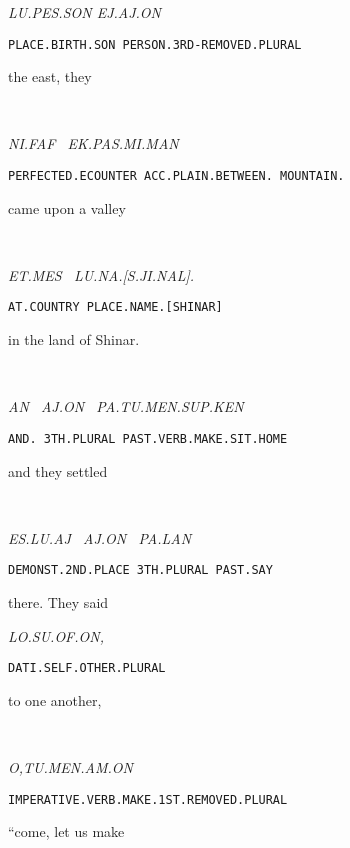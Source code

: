 {{\it LU.PES.SON 	EJ.AJ.ON }

{\tt PLACE.BIRTH.SON	PERSON.3RD-REMOVED.PLURAL }

the east, 		they 		 


\drie 


\Atlanni\faf~\ek\pas\mi\man

{\it NI.FAF~                                EK.PAS.MI.MAN }

{\tt PERFECTED.ECOUNTER  	ACC.PLAIN.BETWEEN. MOUNTAIN.	}

came upon 		a valley                 


\drie  


\et\mes~\lu\na\cartouche{\Atlans\ji\nal}\period

{\it ET.MES~		LU.NA.[S.JI.NAL]. }

{\tt AT.COUNTRY	PLACE.NAME.[SHINAR] }

in the land          of Shinar. 

\drie



\an~\aj\on~\pa\tu\men\Atlansup\ken

{\it AN~	AJ.ON~   PA.TU.MEN.SUP.KEN }

{\tt AND.	3TH.PLURAL	PAST.VERB.MAKE.SIT.HOME	 }

and 	they 		settled			 

\drie
  


\es\lu\aj~\period \aj\on~\pa\lan

{\it ES.LU.AJ~		AJ.ON~		PA.LAN	 }

{\tt DEMONST.2ND.PLACE	3TH.PLURAL	PAST.SAY }

there.			They		said 	 

\drie 


\lo\su\of\on\comma

{\it LO.SU.OF.ON, }

{\tt DATI.SELF.OTHER.PLURAL		 }
 
to one another, 			 
\drie 



  

\Atlano\comma\tu\men\am\on\

{\it O,TU.MEN.AM.ON }

{\tt IMPERATIVE.VERB.MAKE.1ST.REMOVED.PLURAL }

“come, let us make   


\drie 

 


\ek\fuk\jet\on\comma\Atlani\an\

}
